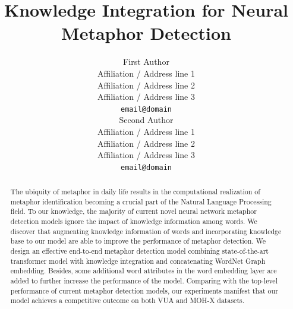 \documentclass[11pt,a4paper]{article}
\title{Knowledge Integration for Neural Metaphor Detection}
\author{First Author \\
  Affiliation / Address line 1 \\
  Affiliation / Address line 2 \\
  Affiliation / Address line 3 \\
  \texttt{email@domain} \\\And
  Second Author \\
  Affiliation / Address line 1 \\
  Affiliation / Address line 2 \\
  Affiliation / Address line 3 \\
  \texttt{email@domain} \\}
\date{}
\begin{document}
\maketitle
\begin{abstract}
   The ubiquity of metaphor in daily life results in the computational realization of metaphor identification becoming a crucial part of the Natural Language Processing field. To our knowledge, the majority of current novel neural network metaphor detection models ignore the impact of knowledge information among words. We discover that augmenting knowledge information of words and incorporating knowledge base to our model are able to improve the performance of metaphor detection. We design an effective end-to-end metaphor detection model combining state-of-the-art transformer model with knowledge integration and concatenating WordNet Graph embedding. Besides, some additional word attributes in the word embedding layer are added to further increase the performance of the model. Comparing with the top-level performance of current metaphor detection models, our experiments manifest that our model achieves a competitive outcome on both VUA and MOH-X datasets.
\end{abstract}


\end{document}
